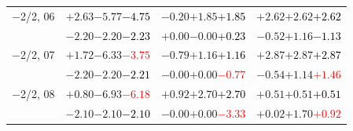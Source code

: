 \documentclass[compress]{beamer}
\begin{document}
\begin{frame}
\begin{tabular}{r | c | c | c}
$-$2/2, 06 & $+2.63$\hspace{0.1 cm}$-5.77$\hspace{0.1 cm}\textcolor{black}{$-4.75$} & $-0.20$\hspace{0.1 cm}$+1.85$\hspace{0.1 cm}\textcolor{black}{$+1.85$} & $+2.62$\hspace{0.1 cm}$+2.62$\hspace{0.1 cm}\textcolor{black}{$+2.62$} \\
           & $-2.20$\hspace{0.1 cm}$-2.20$\hspace{0.1 cm}\textcolor{black}{$-2.23$} & $+0.00$\hspace{0.1 cm}$-0.00$\hspace{0.1 cm}\textcolor{black}{$+0.23$} & $-0.52$\hspace{0.1 cm}$+1.16$\hspace{0.1 cm}\textcolor{black}{$-1.13$} \\
$-$2/2, 07 & $+1.72$\hspace{0.1 cm}$-6.33$\hspace{0.1 cm}\textcolor{red}{$-3.75$} & $-0.79$\hspace{0.1 cm}$+1.16$\hspace{0.1 cm}\textcolor{black}{$+1.16$} & $+2.87$\hspace{0.1 cm}$+2.87$\hspace{0.1 cm}\textcolor{black}{$+2.87$} \\
           & $-2.20$\hspace{0.1 cm}$-2.20$\hspace{0.1 cm}\textcolor{black}{$-2.21$} & $-0.00$\hspace{0.1 cm}$+0.00$\hspace{0.1 cm}\textcolor{red}{$-0.77$} & $-0.54$\hspace{0.1 cm}$+1.14$\hspace{0.1 cm}\textcolor{red}{$+1.46$} \\
$-$2/2, 08 & $+0.80$\hspace{0.1 cm}$-6.93$\hspace{0.1 cm}\textcolor{red}{$-6.18$} & $+0.92$\hspace{0.1 cm}$+2.70$\hspace{0.1 cm}\textcolor{black}{$+2.70$} & $+0.51$\hspace{0.1 cm}$+0.51$\hspace{0.1 cm}\textcolor{black}{$+0.51$} \\
           & $-2.10$\hspace{0.1 cm}$-2.10$\hspace{0.1 cm}\textcolor{black}{$-2.10$} & $-0.00$\hspace{0.1 cm}$+0.00$\hspace{0.1 cm}\textcolor{red}{$-3.33$} & $+0.02$\hspace{0.1 cm}$+1.70$\hspace{0.1 cm}\textcolor{red}{$+0.92$} \\

\end{tabular}
\end{frame}
\end{document}
